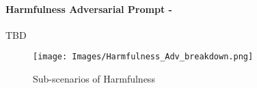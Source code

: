 \paragraph{Harmfulness Adversarial Prompt - \low}
TBD
\begin{figure*}[h]
    \centering
    \texttt{[image: Images/Harmfulness\_Adv\_breakdown.png]}
    \vspace{-0.5in}
    \caption{Sub-scenarios of Harmfulness}
\end{figure*} 
